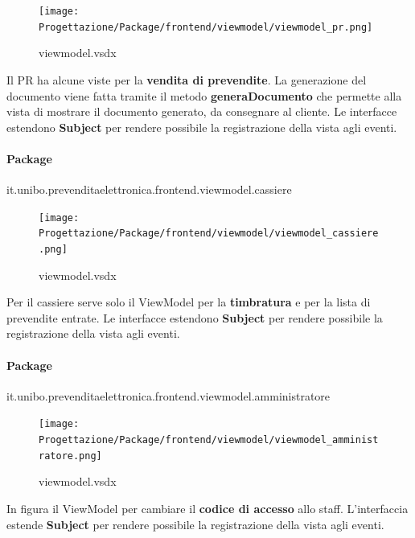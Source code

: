 \documentclass[a4paper]{article}
\begin{document}

\begin{figure}[H]
    \texttt{[image: Progettazione/Package/frontend/viewmodel/viewmodel\_pr.png]}
    \centering
    \caption{viewmodel.vsdx}
\end{figure}

Il PR ha alcune viste per la \textbf{vendita di prevendite}. La generazione del documento viene fatta tramite il metodo \textbf{generaDocumento} che permette alla vista di mostrare il documento generato, da consegnare al cliente.  Le interfacce estendono \textbf{Subject} per rendere possibile la registrazione della vista agli eventi.

\paragraph{Package} it.unibo.prevenditaelettronica.frontend.viewmodel.cassiere


\begin{figure}[H]
    \texttt{[image: Progettazione/Package/frontend/viewmodel/viewmodel\_cassiere.png]}
    \centering
    \caption{viewmodel.vsdx}
\end{figure}

Per il cassiere serve solo il ViewModel per la \textbf{timbratura} e per la lista di prevendite entrate. Le interfacce estendono \textbf{Subject} per rendere possibile la registrazione della vista agli eventi.

\newpage

\paragraph{Package} it.unibo.prevenditaelettronica.frontend.viewmodel.amministratore



\begin{figure}[H]
    \texttt{[image: Progettazione/Package/frontend/viewmodel/viewmodel\_amministratore.png]}
    \centering
    \caption{viewmodel.vsdx}
\end{figure}

In figura il ViewModel per cambiare il \textbf{codice di accesso} allo staff. L'interfaccia estende \textbf{Subject} per rendere possibile la registrazione della vista agli eventi.
\end{document}
